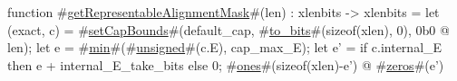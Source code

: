 function #\hyperref[sailRISCVzgetRepresentableAlignmentMask]{getRepresentableAlignmentMask}#(len) : xlenbits -> xlenbits = {
  let (exact, c) = #\hyperref[sailRISCVzsetCapBounds]{setCapBounds}#(default_cap, #\hyperref[sailRISCVztozybits]{to\_bits}#(sizeof(xlen), 0), 0b0 @ len);
  let e = #\hyperref[sailRISCVzmin]{min}#(#\hyperref[sailRISCVzunsigned]{unsigned}#(c.E), cap_max_E);
  let e' = if c.internal_E then e + internal_E_take_bits else 0;
  #\hyperref[sailRISCVzones]{ones}#(sizeof(xlen)-e') @ #\hyperref[sailRISCVzzzeros]{zeros}#(e')
}
